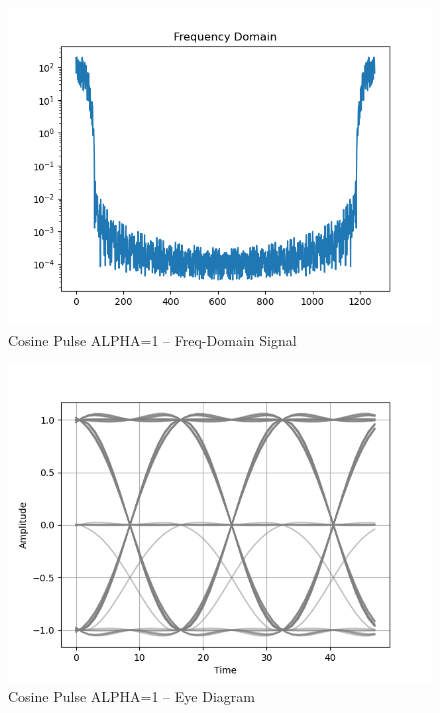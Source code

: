 \documentclass[
	letterpaper, %
	10pt, %
]{CSUniSchoolLabReport}
\begin{document}
\begin{figure}[H] %
	\centering %
	\includegraphics[width=1.2\textwidth]{assignment2k.png} %
	\caption{Cosine Pulse ALPHA=1 -- Freq-Domain Signal}
	\label{fig:block}
\end{figure}

\begin{figure}[H] %
	\centering %
	\includegraphics[width=1.2\textwidth]{assignment2m.png} %
	\caption{Cosine Pulse ALPHA=1 -- Eye Diagram}
	\label{fig:block}
\end{figure}
\end{document}
